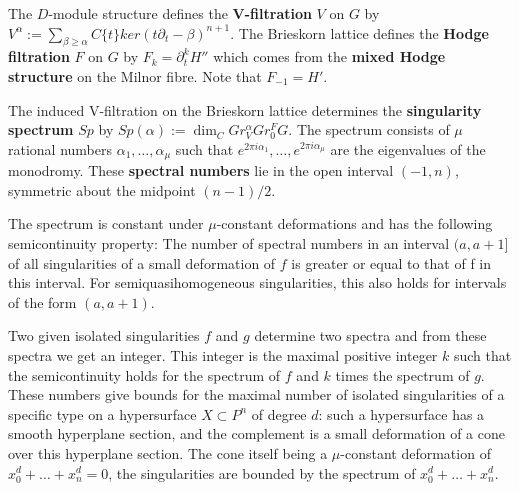 The $D$-module structure defines the {\bf V-filtration} $V$ on $G$ by $V^\alpha:=\sum_{\beta\ge\alpha}C\{t\}ker(t\partial_t-\beta)^{n+1}$.
The Brieskorn lattice defines the {\bf Hodge filtration} $F$ on $G$ by $F_k=\partial_t^kH''$ which comes from the {\bf mixed Hodge structure} on the Milnor fibre.
Note that $F_{-1}=H'$.

The induced V-filtration on the Brieskorn lattice determines the {\bf singularity spectrum} $Sp$ by $Sp(\alpha):=\dim_CGr_V^\alpha Gr^F_0G$.
The spectrum consists of $\mu$ rational numbers $\alpha_1,\dots,\alpha_\mu$ such that $e^{2\pi i\alpha_1},\dots,e^{2\pi i\alpha_\mu}$ are the eigenvalues of the monodromy.
These {\bf spectral numbers} lie in the open interval $(-1,n)$, symmetric about the midpoint $(n-1)/2$.

The spectrum is constant under $\mu$-constant deformations and has the following semicontinuity property:
The number of spectral numbers in an interval $(a,a+1]$ of all singularities of a small deformation of $f$ is greater or equal to that of f in this interval.
For semiquasihomogeneous singularities, this also holds for intervals of the form $(a,a+1)$.

Two given isolated singularities $f$ and $g$ determine two spectra and from these spectra we get an integer.
This integer is the maximal positive integer $k$ such that the semicontinuity holds for the spectrum of $f$ and $k$ times the spectrum of $g$.
These numbers give bounds for the maximal number of isolated singularities of a specific type on a hypersurface $X\subset{P}^n$ of degree $d$: 
such a hypersurface has a smooth hyperplane section, and the complement is a small deformation of a cone over this hyperplane section.
The cone itself being a $\mu$-constant deformation of $x_0^d+\dots+x_n^d=0$, the singularities are bounded by the spectrum of $x_0^d+\dots+x_n^d$.

